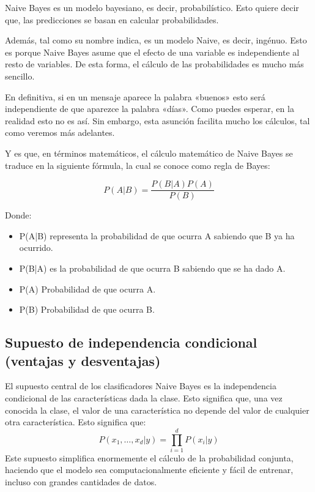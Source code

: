 Naive Bayes es un modelo bayesiano, es decir, probabilístico. Esto quiere decir que, las predicciones se basan en calcular probabilidades.

Además, tal como su nombre indica, es un modelo Naive, es decir, ingénuo. Esto es porque Naive Bayes asume que el efecto de una variable es independiente al resto de variables. De esta forma, el cálculo de las probabilidades es mucho más sencillo.

En definitiva, si en un mensaje aparece la palabra «buenos» esto será independiente de que aparezce la palabra «días». Como puedes esperar, en la realidad esto no es así. Sin embargo, esta asunción facilita mucho los cálculos, tal como veremos más adelantes.

Y es que, en términos matemáticos, el cálculo matemático de Naive Bayes se traduce en la siguiente fórmula, la cual se conoce como regla de Bayes:

\begin{equation}
P(A|B) = \frac{P(B|A)P(A)}{P(B)}
\end{equation}

Donde: 
\begin{itemize}
\item P(A|B) representa la probabilidad de que ocurra A sabiendo que B ya ha ocurrido.
\item P(B|A) es la probabilidad de que ocurra B sabiendo que se ha dado A.
\item P(A) Probabilidad de que ocurra A.
\item P(B) Probabilidad de que ocurra B.
\end{itemize}



\subsection{Supuesto de independencia condicional (ventajas y desventajas)}

El supuesto central de los clasificadores Naive Bayes es la independencia condicional de las características dada la clase.  Esto significa que, una vez conocida la clase, el valor de una característica no depende del valor de cualquier otra característica. 
Esto significa que:
\begin{equation}
P(x_1, \dots, x_d | y) = \prod_{i=1}^d P(x_i | y)
\end{equation}
Este supuesto simplifica enormemente el cálculo de la probabilidad conjunta, haciendo que el modelo sea computacionalmente eficiente y fácil de entrenar, incluso con grandes cantidades de datos. 

